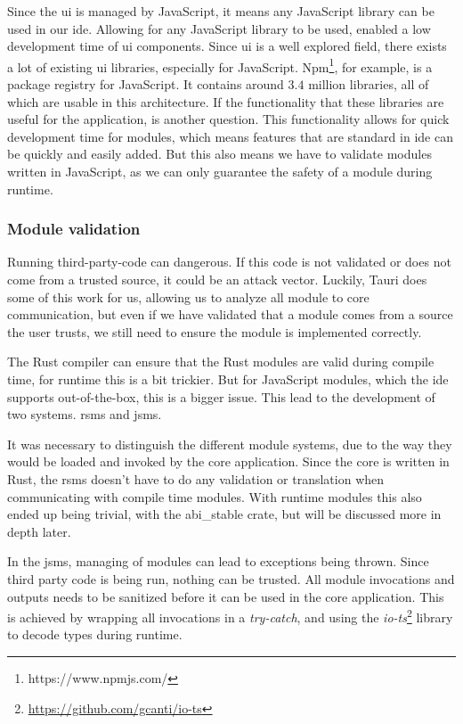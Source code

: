 Since the \gls*{ui} is managed by JavaScript, it means any JavaScript library
can be used in our \gls*{ide}. Allowing for any JavaScript library to be used,
enabled a low development time of \gls*{ui} components. Since \gls*{ui} is a
well explored field, there exists a lot of existing \gls*{ui} libraries,
especially for JavaScript. Npm\footnote{https://www.npmjs.com/}, for example, is
a package registry for JavaScript. It contains around $3.4$ million libraries,
all of which are usable in this architecture. If the functionality that these
libraries are useful for the application, is another question. This
functionality allows for quick development time for modules, which means
features that are standard in \gls*{ide} can be quickly and easily added. But
this also means we have to validate modules written in JavaScript, as we can
only guarantee the safety of a module during runtime.


\subsubsection{Module validation}

Running third-party-code can dangerous. If this code is not validated or does
not come from a trusted source, it could be an attack vector. Luckily, Tauri
does some of this work for us, allowing us to analyze all module to core
communication, but even if we have validated that a module comes from a source
the user trusts, we still need to ensure the module is implemented correctly.

The Rust compiler can ensure that the Rust modules are valid during compile
time, for runtime this is a bit trickier. But for JavaScript modules, which the
\gls*{ide} supports out-of-the-box, this is a bigger issue. This lead to the
development of two systems. \gls*{rsms} and \gls*{jsms}.

It was necessary to distinguish the different module systems, due to the way
they would be loaded and invoked by the core application. Since the core is
written in Rust, the \gls*{rsms} doesn't have to do any validation or
translation when communicating with compile time modules. With runtime modules
this also ended up being trivial, with the abi\_stable crate, but will be
discussed more in depth later.

In the \gls*{jsms}, managing of modules can lead to exceptions being thrown.
Since third party code is being run, nothing can be trusted. All module
invocations and outputs needs to be sanitized before it can be used in the core
application. This is achieved by wrapping all invocations in a
\textit{try-catch}, and using the \textit{io-ts}\footnote{\url{https://github.com/gcanti/io-ts}}
library to decode types during runtime.

